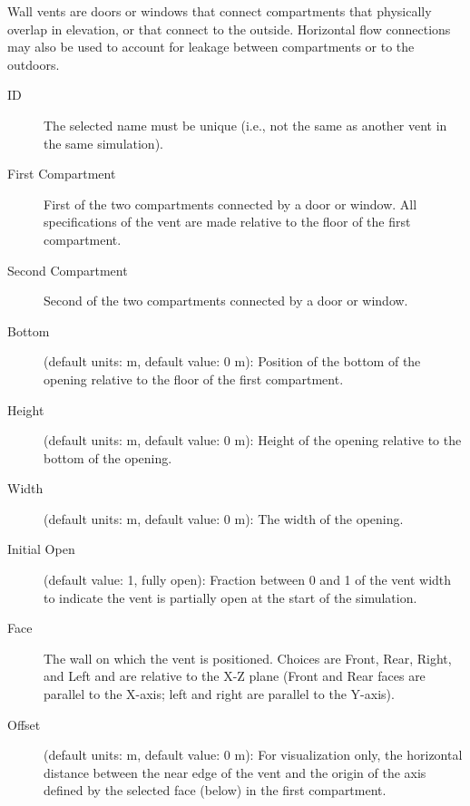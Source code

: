 Wall vents are doors or windows that connect compartments that physically overlap in elevation, or that connect to the outside. Horizontal flow connections may also be used to account for leakage between compartments or to the outdoors.
\begin{description}
\item[ID] The selected name must be unique (i.e., not the same as another vent in the same simulation).
\item[First Compartment] First of the two compartments connected by a door or window. All specifications of the vent are made relative to the floor of the first compartment.
\item[Second Compartment] Second of the two compartments connected by a door or window.
\item[Bottom] (default units: m, default value: 0 m): Position of the bottom of the opening relative to the floor of the first compartment.
\item[Height] (default units: m, default value: 0 m): Height of the opening relative to the bottom of the opening.
\item[Width] (default units: m, default value: 0 m): The width of the opening.
\item[Initial Open] (default value: 1, fully open): Fraction between 0 and 1 of the vent width to indicate the vent is partially open at the start of the simulation.
\item[Face] The wall on which the vent is positioned.  Choices are Front, Rear, Right, and Left and are relative to the X-Z plane (Front and Rear faces are parallel to the X-axis; left and right are parallel to the Y-axis).
\item[Offset] (default units: m, default value: 0 m): For visualization only, the horizontal distance between the near edge of the vent and the origin of the axis defined by the selected face (below) in the first compartment.
\end{description}
